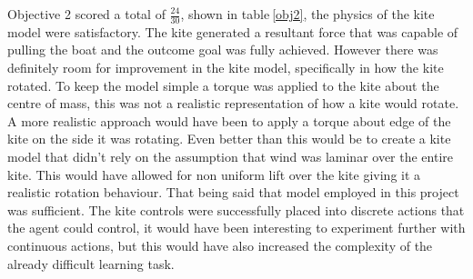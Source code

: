 \begin{table}[!htb]
    \centering
    \caption{Objective 2 Evaluation}\label{obj2}
\end{table}

Objective 2 scored a total of $\frac{24}{30}$, shown in table$~$\ref{obj2}, the physics of the kite model were satisfactory. The kite generated a resultant force that was capable of pulling the boat and the outcome goal was fully achieved. However there was definitely room for improvement in the kite model, specifically in how the kite rotated. To keep the model simple a torque was applied to the kite about the centre of mass, this was not a realistic representation of how a kite would rotate. A more realistic approach would have been to apply a torque about edge of the kite on the side it was rotating. Even better than this would be to create a kite model that didn't rely on the assumption that wind was laminar over the entire kite. This would have allowed for non uniform lift over the kite giving it a realistic rotation behaviour. That being said that model employed in this project was sufficient. The kite controls were successfully placed into discrete actions that the agent could control, it would have been interesting to experiment further with continuous actions, but this would have also increased the complexity of the already difficult learning task.

